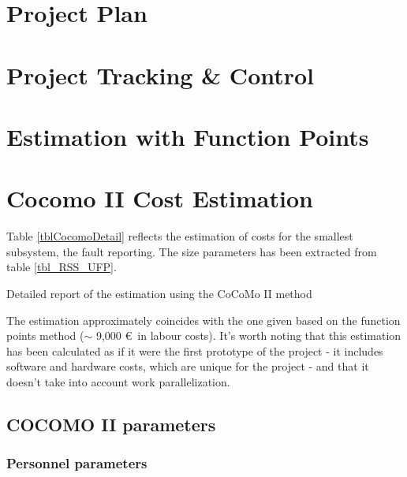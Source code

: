 \documentclass[11pt]{report}
\begin{document}
\chapter{Project Plan}
\label{chapPlan}



\chapter{Project Tracking \& Control}
\label{chapTracking}


\appendix

\chapter{Estimation with Function Points}
\label{chapFunctionPoints}


\chapter{Cocomo II Cost Estimation}
\label{chapCocomo}

Table \ref{tblCocomoDetail} reflects the estimation of costs for the smallest subsystem, the fault reporting. The size parameters has been extracted from table \ref{tbl_RSS_UFP}.

\begin{table}[hbtp]
\centering

\caption{Detailed report of the estimation using the CoCoMo II method}
\label{tblCocomoDetail}
\end{table}

The estimation approximately coincides with the one given based on the function points method ($\sim$ 9,000 \euro\ in labour costs). It's worth noting that this estimation has been calculated as if it were the first prototype of the project - it includes software and hardware costs, which are unique for the project - and that it doesn't take into account work parallelization.

\section{COCOMO II parameters}




\subsection{Personnel parameters}
\end{document}
